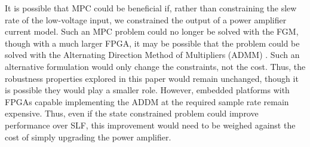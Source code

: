 \documentclass[twocolumn,twoside]{IEEEtran}
\begin{document}
It is possible that MPC could be beneficial if, rather than constraining the slew rate of the low-voltage input, we constrained the output of a power amplifier current model. Such an MPC problem could no longer be solved with the FGM, though with a much larger FPGA, it may be possible that the problem could be solved with the Alternating Direction Method of Multipliers (ADMM) \cite{Jerez_Trans_2014}. Such an alternative formulation would only change the constraints, not the cost. Thus, the robustness properties explored in this paper would remain unchanged, though it is possible they would play a smaller role. However, embedded platforms with FPGAs capable implementing the ADDM at the required sample rate remain expensive. Thus, even if the state constrained problem could improve performance over SLF, this improvement would need to be weighed against the cost of simply upgrading the power amplifier. 






% 

\end{document}
